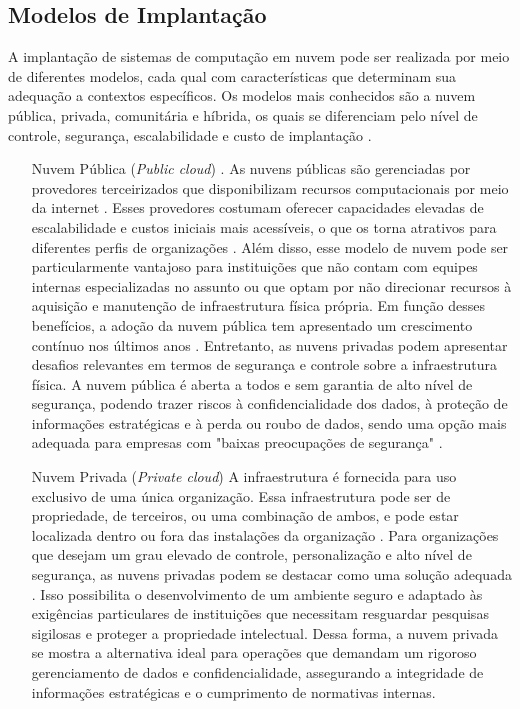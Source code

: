 \subsection{Modelos de Implantação}

A implantação de sistemas de computação em nuvem pode ser realizada por meio de diferentes modelos, cada qual com características que determinam sua adequação a contextos específicos. Os modelos mais conhecidos são a nuvem pública, privada, comunitária e híbrida, os quais se diferenciam pelo nível de controle, segurança, escalabilidade e custo de implantação \cite{mell2011}.

\begin{itemize}
\item[Nuvem Pública (\textit{Public cloud})]. As nuvens públicas são gerenciadas por provedores terceirizados que disponibilizam recursos computacionais por meio da internet \cite{carroll2011}. Esses provedores costumam oferecer capacidades elevadas de escalabilidade e custos iniciais mais acessíveis, o que os torna atrativos para diferentes perfis de organizações \cite{amajuoyi2024}. Além disso, esse modelo de nuvem pode ser particularmente vantajoso para instituições que não contam com equipes internas especializadas no assunto ou que optam por não direcionar recursos à aquisição e manutenção de infraestrutura física própria. Em função desses benefícios, a adoção da nuvem pública tem apresentado um crescimento contínuo nos últimos anos \cite{amajuoyi2024}. Entretanto, as nuvens privadas podem apresentar desafios relevantes em termos de segurança e controle sobre a infraestrutura física. A nuvem pública é aberta a todos e sem garantia de alto nível de segurança, podendo trazer riscos à confidencialidade dos dados, à proteção de informações estratégicas e à perda ou roubo de dados, sendo uma opção mais adequada para empresas com "baixas preocupações de segurança" \cite{sathya2023}.

\item[Nuvem Privada (\textit{Private cloud})] A infraestrutura é fornecida para uso exclusivo de uma única organização. Essa infraestrutura pode ser de propriedade, de terceiros, ou uma combinação de ambos, e pode estar localizada dentro ou fora das instalações da organização \cite{mell2011}. Para organizações que desejam um grau elevado de controle, personalização e alto nível de segurança, as nuvens privadas podem se destacar como uma solução adequada \cite{swapna2023}. Isso possibilita o desenvolvimento de um ambiente seguro e adaptado às exigências particulares de instituições que necessitam resguardar pesquisas sigilosas e proteger a propriedade intelectual. Dessa forma, a nuvem privada se mostra a alternativa ideal para operações que demandam um rigoroso gerenciamento de dados e confidencialidade, assegurando a integridade de informações estratégicas e o cumprimento de normativas internas.


\end{itemize}
